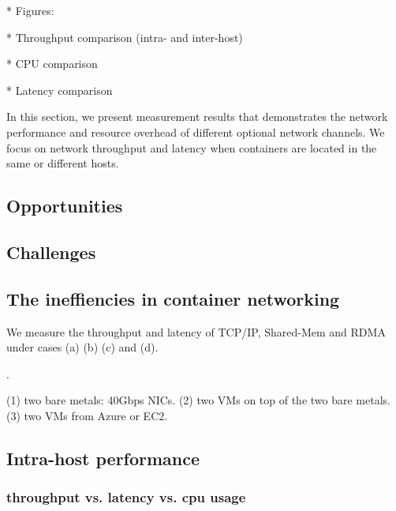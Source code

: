 * Figures:

* Throughput comparison (intra- and inter-host)

* CPU comparison

* Latency comparison

In this section, we present measurement results that demonstrates the network performance and resource overhead of different optional network channels. We focus on network throughput and latency when containers are located in the same or different hosts. 




\subsection{Opportunities}

\subsection{Challenges}

\subsection{The ineffiencies in container networking}

We measure the throughput and latency of TCP/IP, Shared-Mem and RDMA under cases
(a) (b) (c) and (d).

.

(1) two bare metals: 40Gbps NICs.
(2) two VMs on top of the two bare metals.
(3) two VMs from Azure or EC2.

\subsection{Intra-host performance}
\subsubsection{throughput vs. latency vs. cpu usage}

